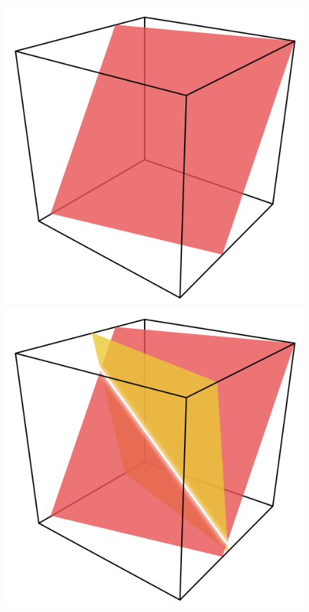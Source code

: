 \documentclass[12pt,a4paper,landscape]{report}
\begin{document}
		\begin{figure}[H]
		\centering
		\includegraphics[width=0.3\paperwidth]{../images/blakeley1.png}
		\includegraphics[width=0.3\paperwidth]{../images/blakeley2.png}

\end{figure}
\end{document}

